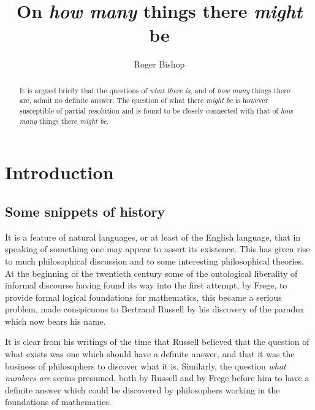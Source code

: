\documentclass{rbjk}
\begin{document}
                                                                                   
\begin{article}
\begin{opening}  
\title{On {\it how many} things there {\it might} be}
\author{Roger Bishop }

\begin{abstract}
It is argued briefly that the questions of {\it what there is}, and of {\it how many} things there are, admit no definite answer.
The question of what there {\it might be} is however susceptible of partial resolution and is found to be closely connected with that of {\it how many} things there {\it might be}.
\end{abstract}
\end{opening}

\section{Introduction}

\subsection{Some snippets of history}

It is a feature of natural languages, or at least of the English language, that in speaking of something one may appear to assert its existence.
This has given rise to much philosophical discussion and to some interesting philosophical theories.
At the beginning of the twentieth century some of the ontological liberality of informal discourse having found its way into the first attempt, by Frege, to provide formal logical foundations for mathematics, this became a serious problem, made conspicuous to Bertrand Russell by his discovery of the paradox which now bears his name.

It is clear from his writings of the time that Russell believed that the question of what exists was one which should have a definite answer, and that it was the business of philosophers to discover what it is.
Similarly, the question {\it what numbers are} seems presumed, both by Russell and by Frege before him to have a definite answer which could be discovered by philosophers working in the foundations of mathematics.


\end{article}
\end{document}
